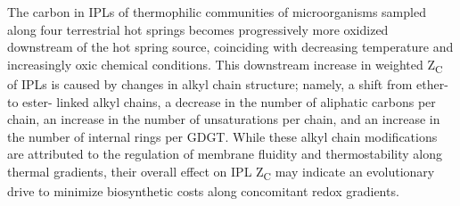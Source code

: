 The carbon in IPLs of thermophilic communities of microorganisms sampled along four terrestrial hot springs becomes progressively more oxidized downstream of the hot spring source, coinciding with decreasing temperature and increasingly oxic chemical conditions. This downstream increase in weighted Z\textsubscript{C} of IPLs is caused by changes in alkyl chain structure; namely, a shift from ether- to ester- linked alkyl chains, a decrease in the number of aliphatic carbons per chain, an increase in the number of unsaturations per chain, and an increase in the number of internal rings per GDGT. While these alkyl chain modifications are attributed to the regulation of membrane fluidity and thermostability along thermal gradients, their overall effect on IPL Z\textsubscript{C} may indicate an evolutionary drive to minimize biosynthetic costs along concomitant redox gradients.

